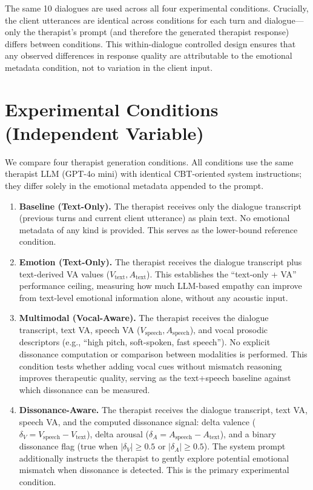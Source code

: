 The same 10 dialogues are used across all four experimental conditions. Crucially, the client utterances are identical across conditions for each turn and dialogue---only the therapist's prompt (and therefore the generated therapist response) differs between conditions. This within-dialogue controlled design ensures that any observed differences in response quality are attributable to the emotional metadata condition, not to variation in the client input.

\section{Experimental Conditions (Independent Variable)}

We compare four therapist generation conditions. All conditions use the same therapist LLM (GPT-4o mini) with identical CBT-oriented system instructions; they differ solely in the emotional metadata appended to the prompt.

\begin{enumerate}
    \item \textbf{Baseline (Text-Only).} The therapist receives only the dialogue transcript (previous turns and current client utterance) as plain text. No emotional metadata of any kind is provided. This serves as the lower-bound reference condition.

    \item \textbf{Emotion (Text-Only).} The therapist receives the dialogue transcript plus text-derived VA values ($V_{\text{text}}, A_{\text{text}}$). This establishes the ``text-only + VA'' performance ceiling, measuring how much LLM-based empathy can improve from text-level emotional information alone, without any acoustic input.

    \item \textbf{Multimodal (Vocal-Aware).} The therapist receives the dialogue transcript, text VA, speech VA ($V_{\text{speech}}, A_{\text{speech}}$), and vocal prosodic descriptors (e.g., ``high pitch, soft-spoken, fast speech''). No explicit dissonance computation or comparison between modalities is performed. This condition tests whether adding vocal cues without mismatch reasoning improves therapeutic quality, serving as the text+speech baseline against which dissonance can be measured.

    \item \textbf{Dissonance-Aware.} The therapist receives the dialogue transcript, text VA, speech VA, and the computed dissonance signal: delta valence ($\delta_V = V_{\text{speech}} - V_{\text{text}}$), delta arousal ($\delta_A = A_{\text{speech}} - A_{\text{text}}$), and a binary dissonance flag (true when $|\delta_V| \geq 0.5$ or $|\delta_A| \geq 0.5$). The system prompt additionally instructs the therapist to gently explore potential emotional mismatch when dissonance is detected. This is the primary experimental condition.
\end{enumerate}

